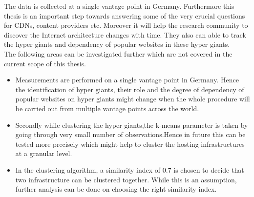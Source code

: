 \noindent The data is collected at a single vantage point in Germany. Furthermore this thesis is an important step towards answering some of the very crucial questions for CDNs, content providers etc. Moreover it will help the research community to discover the Internet architecture changes with time. They also can able to track the hyper giants and dependency of popular websites in these hyper giants.\\

The following areas can be investigated further which are not covered in the current scope of this thesis.

\begin{itemize}
\item Measurements are performed on a single vantage point in Germany. Hence the identification of hyper giants, their role and the degree of dependency of popular websites on hyper giants might change when the whole procedure will be carried out from multiple vantage points across the world. 

\item Secondly while clustering the hyper giants,the k-means parameter is taken by going through very small number of observations.Hence in future this can be tested more precisely which might help to cluster the hosting infrastructures at a granular level.

\item In the clustering algorithm, a similarity index of 0.7 is chosen to decide that two infrastructure can be clustered together. While this is an assumption, further analysis can be done on choosing the right similarity index.

\end{itemize}

